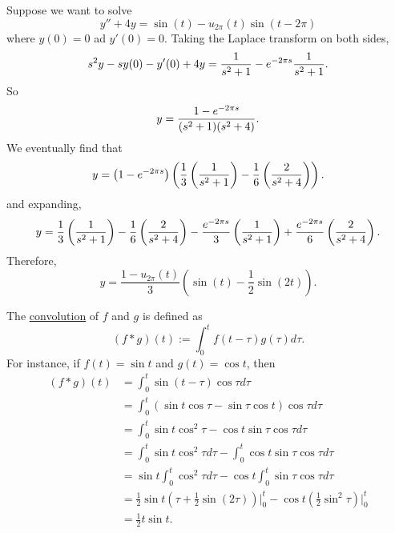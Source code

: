\documentclass[11pt, oneside]{article}   	%
\let\L\relax
\newcommand{\L}[1]{\mathcal{L}\left\{#1\right\}}
\begin{document}
Suppose we want to solve
$$
y'' + 4y = \sin (t) -u_{2\pi}(t)\sin(t-2\pi)
$$
where $y(0) = 0$ ad $y'(0) = 0$. Taking the Laplace transform on both sides,
$$
s^2\L{y} -sy(0) - y'(0) +4\L{y} = \frac{1}{s^2+1} - e^{-2\pi s}{\frac{1}{s^2+1}}.
$$
So
$$
\L{y}= \frac{1-e^{-2\pi s}}{(s^2 + 1)(s^2 + 4)}.
$$
We eventually find that
$$
\L{y} = \left(1-e^{-2\pi s}\right) \left(\frac{1}{3}\left(\frac{1}{s^2 + 1}\right) -\frac{1}{6}\left(\frac{2}{s^2+4}\right)\right)      .
$$
and expanding,
$$
\L{y} =  \frac{1}{3}\left(\frac{1}{s^2+1}\right) - \frac{1}{6}\left(\frac{2}{s^2 + 4}\right) - \frac{e^{-2\pi s}}{3}\left(\frac{1}{s^2+1}\right) +   \frac{e^{-2\pi s}}{6}\left(\frac{2}{s^2 + 4}\right)            .
$$
Therefore, 
$$
y =  \frac{1-u_{2\pi}(t)}{3}\left(  \sin(t) - \frac{1}{2}\sin(2t)  \right)  . 
$$ %

The \underline{convolution} of $f$ and $g$ is defined as 
$$
(f*g)(t) := \int_0^t f(t-\tau)g(\tau)d\tau.
$$
For instance, if $f(t) =\sin t$ and $g(t) =\cos t$, then
\begin{align*}
(f*g)(t) 	&= \int _0^t \sin(t-\tau)\cos\tau d\tau\\
		&= \int_0^t (\sin t\cos \tau - \sin\tau \cos t) \cos \tau d\tau\\
		&= \int_0^t \sin t\cos^2\tau - \cos t\sin \tau\cos \tau d\tau\\
		&= \int_0^t \sin t\cos^2\tau d\tau - \int_0^t  \cos t\sin \tau\cos \tau d\tau\\
		& = \sin t \int_0^t \cos^2\tau d\tau - \cos t \int_0^t \sin\tau\cos\tau d\tau\\
		&=\frac{1}{2}\sin t \left( \tau + \frac{1}{2}\sin(2\tau) \right)\Bigg|_0^t - \cos t\left(  \frac{1}{2}\sin^2\tau  \right)\Bigg|_0^t\\
		&=  \frac{1}{2} t\sin t.
\end{align*}
\end{document}
